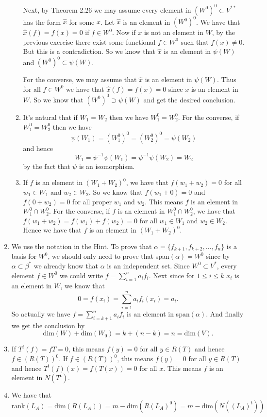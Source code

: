 \begin{enumerate}
\begin{enumerate}
Next, by Theorem 2.26 we may assume every element in $(W^0)^0\subset V^{**}$ has the form $\hat{x}$ for some $x$. Let $\hat{x}$ is an element in $(W^0)^0$. We have that $\hat{x}(f)=f(x)=0$ if $f\in W^0$. Now if $x$ is not an element in $W$, by the previous exercise there exist some functional $f\in W^0$ such that $f(x)\neq 0$. But this is a contradiction. So we know that $\hat{x}$ is an element in $\psi(W)$ and $(W^0)^0\subset \psi(W)$.

For the converse, we may assume that $\hat{x}$ is an element in $\psi(W)$. Thus for all $f\in W^0$ we have that $\hat{x}(f)=f(x)=0$ since $x$ is an element in $W$. So we know that $(W^0)^0\supset \psi(W)$ and get the desired conclusion.
\item It's natural that if $W_1=W_2$ then we have $W_1^0=W_2^0$. For the converse, if $W_1^0=W_2^0$ then we have 
\[\psi(W_1)=(W_1^0)^0=(W_2^0)^0=\psi(W_2)\]
and hence 
\[W_1=\psi^{-1}\psi(W_1)=\psi^{-1}\psi(W_2)=W_2\]
by the fact that $\psi$ is an isomorphism.
\item If $f$ is an element in $(W_1+W_2)^0$, we have that $f(w_1+w_2)=0$ for all $w_1\in W_1$ and $w_2\in W_2$. So we know that $f(w_1+0)=0$ and $f(0+w_2)=0$ for all proper $w_1$ and $w_2$. This means $f$ is an element in $W_1^0\cap W_2^0$. For the converse, if $f$ is an element in $W_1^0\cap W_2^0$, we have that $f(w_1+w_2)=f(w_1)+f(w_2)=0$ for all $w_1\in W_1$ and $w_2\in W_2$. Hence we have that $f$ is an element in $(W_1+W_2)^0$.
\end{enumerate}
\item We use the notation in the Hint. To prove that $\alpha=\{f_{k+1},f_{k+2},\ldots ,f_n\}$ is a basis for $W^0$, we should only need to prove that span$(\alpha )=W^0$ since by $\alpha \subset \beta^*$ we already know that $\alpha $ is an independent set. Since $W^0\subset V^*$, every element $f\in W^0$ we could write $f=\sum_{i=1}^n{a_if_i}$. Next since for $1\leq i \leq k$ $x_i$ is an element in $W$, we know that 
\[0=f(x_i)=\sum_{i=1}^n{a_if_i(x_i)}=a_i.\] 
So actually we have $f=\sum_{i=k+1}^n{a_if_i}$ is an element in span$(\alpha )$. And finally we get the conclusion by 
\[\mathrm{dim}(W)+\mathrm{dim}(W_0)=k+(n-k)=n=\mathrm{dim}(V).\]
\item If $T^t(f)=fT=0$, this means $f(y)=0$ for all $y\in R(T)$ and hence $f\in (R(T))^0$. If $f\in (R(T))^0$, this means $f(y)=0$ for all $y\in R(T)$ and hence $T^t(f)(x)=f(T(x))=0$ for all $x$. This means $f$ is an element in $N(T^t)$.
\item We have that 
\[\mathrm{rank}(L_A)=\mathrm{dim}(R(L_A))=m-\mathrm{dim}(R(L_A)^0)=m-\mathrm{dim}(N((L_A)^t))\]

\end{enumerate}

